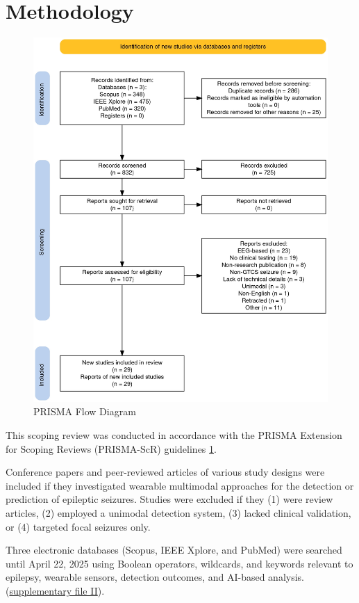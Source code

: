 \section{Methodology}
\begin{figure}
    \centering
    \includegraphics[width=1\textwidth]{methodology/figures/prisma_flow_diagram.jpg}
    \caption{PRISMA Flow Diagram}
    \label{fig:prisma_flow_diagram}
\end{figure}

This scoping review was conducted in accordance with the PRISMA Extension for Scoping Reviews (PRISMA-ScR) guidelines \cite{Tricco2018-bb} \ref{fig:prisma_flow_diagram}.

Conference papers and peer-reviewed articles of various study designs were included if they investigated wearable multimodal approaches for the detection or prediction of epileptic seizures. Studies were excluded if they (1) were review articles, (2) employed a unimodal detection system, (3) lacked clinical validation, or (4) targeted focal seizures only.

Three electronic databases (Scopus, IEEE Xplore, and PubMed) were searched until April 22, 2025  using Boolean operators, wildcards, and keywords relevant to epilepsy, wearable sensors, detection outcomes, and AI-based analysis. (\href{https://docs.google.com/document/d/1FJTEZIhRoBhq3tmehHFUZllaM-GqR_4c1j9waukcQow/edit?tab=t.0}{supplementary file II}). 

